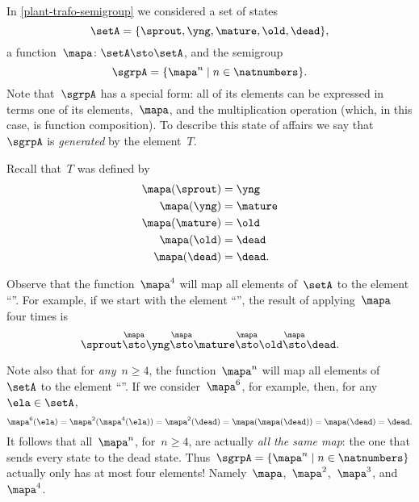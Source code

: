 
\clearmargin


\section{}


In \cref{plant-trafo-semigroup} we considered a set of states
%
\begin{equation}
  \setA= \{ \sprout, \yng, \mature, \old, \dead \},
\end{equation}
%
a function~$\mapa \colon \setA \sto \setA$, and the semigroup
%
\begin{equation}
  \label{eq:trafo-sgrp-one-gen}
  \sgrpA = \{ \mapa^n \mid n \in \natnumbers \}.
\end{equation}
%
Note that~$\sgrpA$ has a special form: all of its elements can be expressed in terms one of its elements,~$\mapa$, and the multiplication operation (which, in this case, is function composition).
To describe this state of affairs we say that~$\sgrpA$ is \emph{generated} by the element~$T$.


Recall that~$T$ was defined by
%
\begin{align*}
  \mapa(\sprout) &=  \yng \\
  \mapa(\yng) &=  \mature \\
  \mapa(\mature) &=  \old \\
  \mapa( \old) &= \dead \\
  \mapa(\dead) &= \dead.
\end{align*}

Observe that the function~$\mapa^4$ will map all elements of~$\setA$ to the element ``\dead''. For example, if we start with the element ``\sprout'', the result of applying~$\mapa$ four times is
%
\begin{equation*}
  \sprout \overset{\mapa}{\sto} \yng \overset{\mapa}{\sto} \mature \overset{\mapa}{\sto} \old \overset{\mapa}{\sto} \dead.
\end{equation*}

Note also that for \emph{any}~$n \geq 4$, the function~$\mapa^n$ will map all elements of~$\setA$ to the element ``\dead''.
If we consider~$\mapa^6$, for example, then, for any~$\ela \in \setA$,
%
\begin{equation*}
  \mapa^6(\ela) = \mapa^2(\mapa^4(\ela)) = \mapa^2(\dead) = \mapa(\mapa(\dead)) = \mapa(\dead) = \dead.
\end{equation*}
%
It follows that all~$\mapa^n$, for~$n \geq 4$, are actually \emph{all the same map}: the one that sends every state to the dead state.
Thus~$\sgrpA = \{ \mapa^n \mid n \in \natnumbers \}$ actually only has at most four elements! Namely~$\mapa$,~$\mapa^2$,~$\mapa^3$, and~$\mapa^4$.

